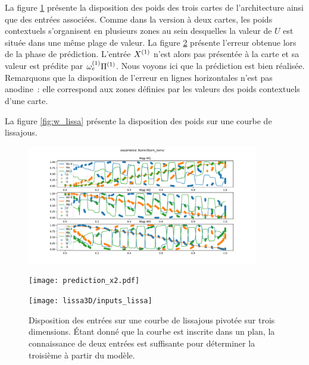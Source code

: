 \documentclass[../main]{subfiles}
\begin{document}
La figure \ref{fig:w_cercle} présente la disposition des poids des trois cartes de l'architecture ainsi que des entrées associées. Comme dans la version à deux cartes, les poids contextuels s'organisent en plusieurs zones au sein desquelles la valeur de $U$ est située dans une même plage de valeur. La figure \ref{fig:pred_cercle} présente l'erreur obtenue lors de la phase de prédiction. L'entrée $X^{({1})}$ n'est alors pas présentée à la carte et sa valeur est prédite par $\omega_{e}^{({1})}{\Pi^{({1})}}$. Nous voyons ici que la prédiction est bien réalisée. Remarquons que la disposition de l'erreur en lignes horizontales n'est pas anodine~: elle correspond aux zones définies par les valeurs des poids contextuels d'une carte.

La figure \ref{fig:w_lissa} présente la disposition des poids sur une courbe de lissajous.
\begin{figure}
	\centering\includegraphics[width=0.9\textwidth]{3som_cercle_w.pdf}
	\caption{\label{fig:w_cercle}}
\end{figure}

\begin{figure}
	\texttt{[image: prediction\_x2.pdf]}
	\caption{\label{fig:pred_cercle}}
\end{figure}

\begin{figure}
	\centering\texttt{[image: lissa3D/inputs\_lissa]}
	\caption{Disposition des entrées sur une courbe de lissajous pivotée sur trois dimensions. Étant donné que la courbe est inscrite dans un plan, la connaissance de deux entrées est suffisante pour déterminer la troisième à partir du modèle.\label{fig:in_lissa_3D}}
\end{figure}
\end{document}
